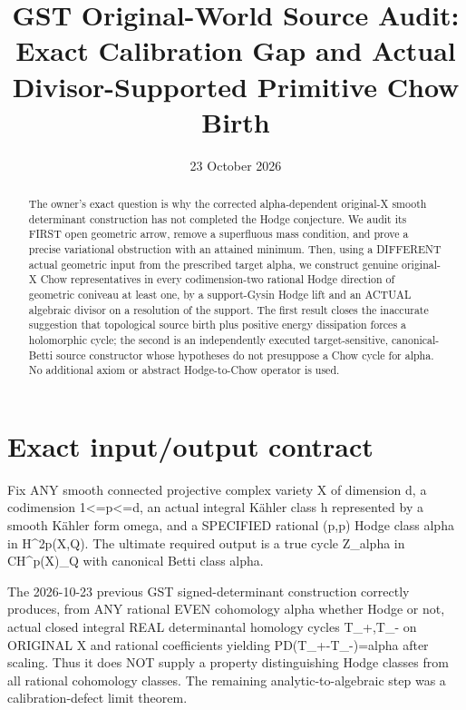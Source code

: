\documentclass[11pt]{article}
\title{GST Original-World Source Audit: Exact Calibration Gap and Actual Divisor-Supported Primitive Chow Birth}
\date{23 October 2026}
\begin{document}
\maketitle
\begin{abstract}
The owner's exact question is why the corrected alpha-dependent
original-X smooth determinant construction has not completed
the Hodge conjecture. We audit its FIRST open geometric arrow,
remove a superfluous mass condition, and prove a precise
variational obstruction with an attained minimum. Then, using
a DIFFERENT actual geometric input from the prescribed target
alpha, we construct genuine original-X Chow representatives
in every codimension-two rational Hodge direction of geometric
coniveau at least one, by a support-Gysin Hodge lift and an
ACTUAL algebraic divisor on a resolution of the support.
The first result closes the inaccurate suggestion that
topological source birth plus positive energy dissipation
forces a holomorphic cycle; the second is an independently
executed target-sensitive, canonical-Betti source constructor
whose hypotheses do not presuppose a Chow cycle for alpha.
No additional axiom or abstract Hodge-to-Chow operator is used.
\end{abstract}
\section{Exact input/output contract}
Fix ANY smooth connected projective complex variety X
of dimension d, a codimension 1<=p<=d, an actual integral
K\"ahler class h represented by a smooth K\"ahler form
omega, and a SPECIFIED rational (p,p) Hodge class
alpha in H^{2p}(X,Q). The ultimate required output
is a true cycle Z_alpha in CH^p(X)_Q
with canonical Betti class alpha.

The 2026-10-23 previous GST signed-determinant construction
correctly produces, from ANY rational EVEN cohomology alpha
whether Hodge or not, actual closed integral REAL
determinantal homology cycles T_+,T_- on ORIGINAL X
and rational coefficients yielding PD(T_+-T_-)=alpha
after scaling. Thus it does NOT supply a property
distinguishing Hodge classes from all rational
cohomology classes. The remaining analytic-to-algebraic
step was a calibration-defect limit theorem.
\end{document}
